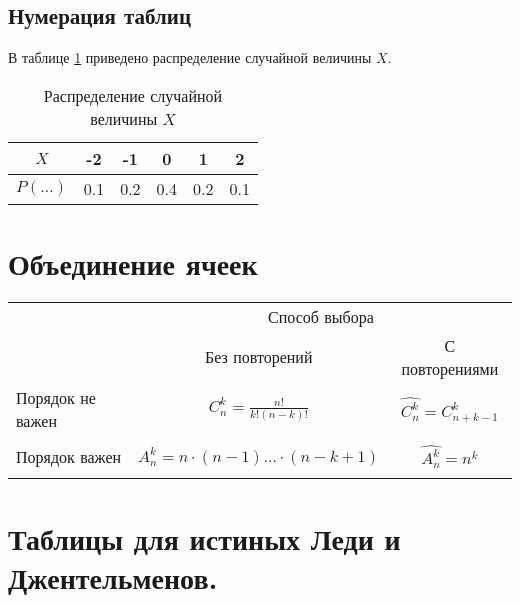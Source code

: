 \documentclass[12pt, a4paper]{article}
\begin{document}


\subsection{Нумерация таблиц}

В таблице \ref{tab:random} приведено распределение случайной величины $X$.

\begin{table}[h!]
\caption{Распределение случайной величины $X$}\label{tab:random}
\begin{center}
\begin{tabular}{|c|c|c|c|c|c|}
\hline
$X$ & -2 & -1 & 0 & 1 & 2 \\
\hline
$P(\ldots)$ & 0.1 & 0.2 & 0.4 & 0.2 & 0.1 \\
\hline
\end{tabular}
\end{center}
\end{table}



\section{Объединение ячеек}

\begin{center}
\begin{tabular}{ |l|c|c| }
\hline
 & \multicolumn{2}{c|}{Способ выбора} \\
\cline{2-3}
 & Без повторений & С повторениями  \\ \hline
\multirow{3}{*}{Порядок не важен}
                & & \\
                & $ C_n^{k} = \frac{n!}{k!(n-k)!} $ & $ \hat{C_n^k} = C_{n+k-1}^k $ \\
                & & \\

\hline
\multirow{3}{*}{Порядок важен}
               & & \\
               & $ A_n^{k} = n \cdot (n-1) \ldots \cdot (n-k+1) $ & $ \hat{A_n^k} = n^k $ \\
               & & \\
\hline
\end{tabular}
\end{center}


\section{Таблицы для истиных Леди и Джентельменов.}
\end{document}

